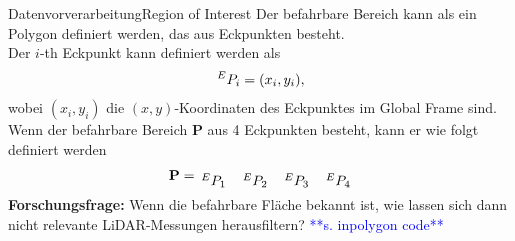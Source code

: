 \documentclass[169, handout	]{THIbeamer} %
\begin{document}
	\begin{frame}{Datenvorverarbeitung}{Region of Interest}
		Der befahrbare Bereich kann als ein Polygon definiert werden, das aus Eckpunkten besteht.\\
		Der $i$-th Eckpunkt kann definiert werden als
		\begin{align}
			\hspace*{0.2em}^E\vspace*{-0.2em}P_{i}=(x_i,y_i),
		\end{align}
wobei $(x_i,y_i)$ die $(x,y)$-Koordinaten des Eckpunktes im Global Frame sind.\\
		Wenn der befahrbare Bereich $\mathbf{P}$ aus 4 Eckpunkten besteht, kann er wie folgt definiert werden
		\begin{align}
			\mathbf{P}=\begin{matrix}
				\hspace*{0.2em}^E\vspace*{-0.2em}P_{1}&\hspace*{0.2em}^E\vspace*{-0.2em}P_{2}&\hspace*{0.2em}^E\vspace*{-0.2em}P_{3}&\hspace*{0.2em}^E\vspace*{-0.2em}P_{4}
			\end{matrix}
		\end{align}
	\textbf{Forschungsfrage:} Wenn die befahrbare Fläche bekannt ist, wie lassen sich dann nicht relevante LiDAR-Messungen herausfiltern? \textcolor{blue}{**s. inpolygon code**}
	\end{frame}
	
\end{document}
